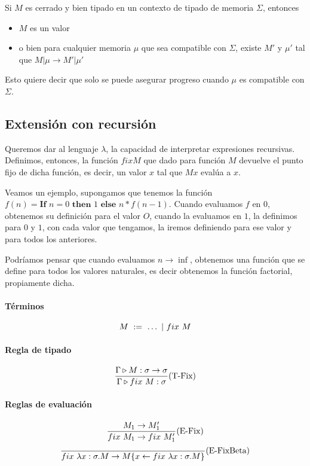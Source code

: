 \begin{centrado}
    Si $M$ es cerrado y bien tipado en un contexto de tipado de memoria $\Sigma$, entonces
    \begin{itemize}
        \item $M$ es un valor
        \item o bien para cualquier memoria $\mu$ que sea compatible con $\Sigma$, existe $M'$ y $\mu'$ tal que $M|\mu\to M'|\mu'$
    \end{itemize}
\end{centrado}

Esto quiere decir que solo se puede asegurar progreso cuando $\mu$ es compatible con $\Sigma$.

\subsection{Extensión con recursión}\label{lambda_calculo:recursion}
Queremos dar al lenguaje $\lambda$, la capacidad de interpretar expresiones recursivas. Definimos, entonces, la función $fix M$ que dado para función $M$ devuelve el punto fijo de dicha función, es decir, un valor $x$ tal que $M x$ evalúa a $x$.

Veamos un ejemplo, supongamos que tenemos la función $f(n) = \textbf{If } n=0 \textbf{ then } 1 \textbf{ else } n*f(n-1)$. Cuando evaluamos $f$ en $0$, obtenemos su definición para el valor $O$, cuando la evaluamos en $1$, la definimos para $0$ y $1$, con cada valor que tengamos, la iremos definiendo para ese valor y para todos los anteriores. 

Podríamos pensar que cuando evaluamos $n\to\inf$, obtenemos una función que se define para todos los valores naturales, es decir obtenemos la función factorial, propiamente dicha.

\paragraph{Términos}
$$M~:=~\dots~|~fix~M$$

\paragraph{Regla de tipado}
\begin{equation*}
    \frac{\Gamma\triangleright M : \sigma\to\sigma}{\Gamma\triangleright fix~M : \sigma}(\text{T-Fix})
\end{equation*}

\paragraph{Reglas de evaluación}
\begin{equation*}
    \frac{M_1\to M'_1}{fix~M_1\to fix~M'_1}(\text{E-Fix})
\end{equation*}
\vspace*{5mm}
\begin{equation*}
\frac{}{fix~\lambda x: \sigma . M\to M\{x\leftarrow fix~\lambda x: \sigma . M\}}(\text{E-FixBeta})
\end{equation*}